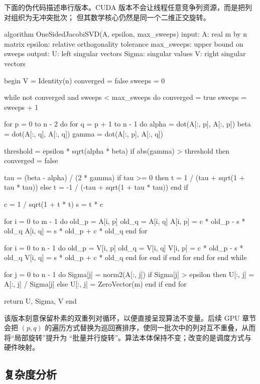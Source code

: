下面的伪代码描述串行版本。CUDA 版本不会让线程任意竞争列资源，而是把列对组织为无冲突批次；
但其数学核心仍然是同一个二维正交旋转。

\begin{pseudolisting}
    algorithm OneSidedJacobiSVD(A, epsilon, max_sweeps)
    input:
    A: real m by n matrix
    epsilon: relative orthogonality tolerance
    max_sweeps: upper bound on sweeps
    output:
    U: left singular vectors
    Sigma: singular values
    V: right singular vectors

    begin
    V = Identity(n)
    converged = false
    sweeps = 0

    while not converged and sweeps < max_sweeps do
    converged = true
    sweeps = sweeps + 1

    for p = 0 to n - 2 do
    for q = p + 1 to n - 1 do
    alpha = dot(A[:, p], A[:, p])
    beta  = dot(A[:, q], A[:, q])
    gamma = dot(A[:, p], A[:, q])

    threshold = epsilon * sqrt(alpha * beta)
    if abs(gamma) > threshold then
    converged = false

    tau = (beta - alpha) / (2 * gamma)
    if tau >= 0 then
    t = 1 / (tau + sqrt(1 + tau * tau))
    else
    t = -1 / (-tau + sqrt(1 + tau * tau))
    end if

    c = 1 / sqrt(1 + t * t)
    s = t * c

    for i = 0 to m - 1 do
    old_p = A[i, p]
    old_q = A[i, q]
    A[i, p] = c * old_p - s * old_q
    A[i, q] = s * old_p + c * old_q
    end for

    for i = 0 to n - 1 do
    old_p = V[i, p]
    old_q = V[i, q]
    V[i, p] = c * old_p - s * old_q
    V[i, q] = s * old_p + c * old_q
    end for
    end if
    end for
    end for
    end while

    for j = 0 to n - 1 do
    Sigma[j] = norm2(A[:, j])
    if Sigma[j] > epsilon then
    U[:, j] = A[:, j] / Sigma[j]
    else
    U[:, j] = ZeroVector(m)
    end if
    end for

    return U, Sigma, V
    end
\end{pseudolisting}

该版本刻意保留朴素的双重列对循环，以便直接呈现算法不变量。后续 GPU 章节会把
$(p,q)$ 的遍历方式替换为巡回赛排序，使同一批次中的列对互不重叠，从而将“局部旋转”提升为
“批量并行旋转”。算法本体保持不变；改变的是调度方式与硬件映射。

\subsection{复杂度分析}

